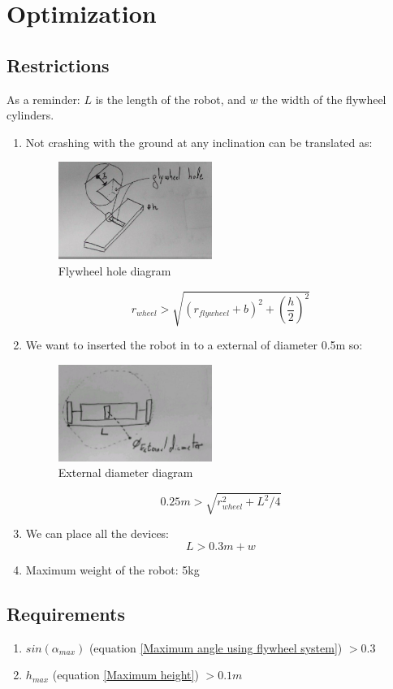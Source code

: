 \section{Optimization}

\subsection{Restrictions}
As a reminder: $L$ is the length of the robot, and $w$ the width of the flywheel cylinders.
\begin{enumerate}
\item Not crashing with the ground at any inclination can be translated as:
\begin{figure}[ht]
	\centering
	\includegraphics[width=5cm]{img/flywheel_hole.jpg}
	\caption{Flywheel hole diagram}
	\label{fig:Flywheel hole diagram}
\end{figure}
\[r_{wheel}> \sqrt{(r_{flywheel} + b)^2+(\frac{h}{2})^2}\]
\item We want to inserted the robot in to a external of diameter 0.5m so:
\begin{figure}[ht]
	\centering
	\includegraphics[width=5cm]{img/external_diameter.jpg}
	\caption{External diameter diagram}
	\label{fig:External diameter diagram}
\end{figure}
\[0.25 m > \sqrt{r_{wheel}^2 + L^2/4}\]
\item We can place all the devices:
\[L > 0.3m + w \]
\item Maximum weight of the robot: 5kg
\end{enumerate}

\subsection{Requirements}
\begin{enumerate}
	\item $sin(\alpha_{max})$ (equation \ref{Maximum angle using flywheel system}) $> 0.3$
	\item $h_{max}$ (equation \ref{Maximum height}) $> 0.1m$
\end{enumerate}
	


